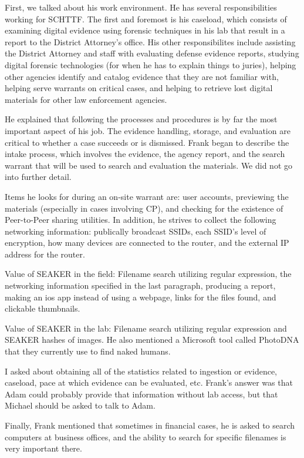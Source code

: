 \documentclass[12pt]{article}
\begin{document}
First, we talked about his work environment.  He has several responsibilities working for SCHTTF.  The first
and foremost is his caseload, which consists of examining digital evidence using forensic techniques in his
lab that result in a report to the District Attorney's office.  His other responsibilites include assisting
the District Attorney and staff with evaluating defense evidence reports, studying digital forensic 
technologies (for when he has to explain things to juries), helping other agencies identify and catalog
evidence that they are not familiar with, helping serve warrants on critical cases, and helping to retrieve
lost digital materials for other law enforcement agencies.

He explained that following the processes and procedures is by far the most important aspect of his job.  The
evidence handling, storage, and evaluation are critical to whether a case succeeds or is dismissed. Frank
began to describe the intake process, which involves the evidence, the agency report, and the search warrant
that will be used to search and evaluation the materials.  We did not go into further detail.

Items he looks for during an on-site warrant are: user accounts, previewing the materials (especially in
cases involving CP), and checking for the existence of Peer-to-Peer sharing utilities.  In addition, he 
strives to collect the following networking information: publically broadcast SSIDs, each SSID's level of
encryption, how many devices are connected to the router, and the external IP address for the router.

Value of SEAKER in the field: Filename search utilizing regular expression, the networking information 
specified in the last paragraph, producing a report, making an ios app instead of using a webpage, links
for the files found, and clickable thumbnails.

Value of SEAKER in the lab: Filename search utilizing regular expression and SEAKER hashes of images.  He
also mentioned a Microsoft tool called PhotoDNA that they currently use to find naked humans.

I asked about obtaining all of the statistics related to ingestion or evidence, caseload, pace at which
evidence can be evaluated, etc.  Frank's answer was that Adam could probably provide that information
without lab access, but that Michael should be asked to talk to Adam.

Finally, Frank mentioned that sometimes in financial cases, he is asked to search computers at business
offices, and the ability to search for specific filenames is very important there.
\end{document}
